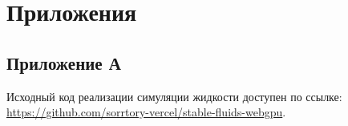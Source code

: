 \newpage
\section*{Приложения}
\subsection*{Приложение А}
Исходный код реализации симуляции жидкости доступен по ссылке: \url{https://github.com/sorrtory-vercel/stable-fluids-webgpu}.
